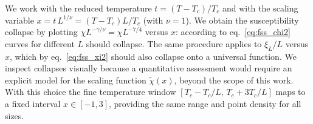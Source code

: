 We work with the reduced temperature $t=(T-T_c)/T_c$ and with the scaling variable $x=t\,L^{1/\nu}=(T-T_c)L/T_c$ (with $\nu=1$). We obtain the susceptibility collapse by plotting $\chi L^{-\gamma/\nu}=\chi L^{-7/4}$ versus $x$: according to eq.~\eqref{eq:fss_chi2} curves for different $L$ should collapse. The same procedure applies to $\xi_L/L$ versus $x$, which by eq.~\eqref{eq:fss_xi2} should also collapse onto a universal function. We inspect collapses visually because a quantitative assessment would require an explicit model for the scaling function $\tilde{\chi}(x)$, beyond the scope of this work. With this choice the fine temperature window $[T_c-T_c/L,\,T_c+3T_c/L]$ maps to a fixed interval $x\in[-1,3]$, providing the same range and point density for all sizes.